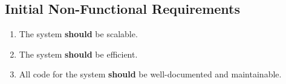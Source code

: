 \subsection{Initial Non-Functional Requirements}
\label{initial_non_functional_requirements}

\begin{enumerate}[label=\textbf{NF\arabic*:}]
  \item The system \textbf{should} be scalable.
  \item The system \textbf{should} be efficient.
  \item All code for the system \textbf{should} be well-documented and maintainable.
\end{enumerate}
